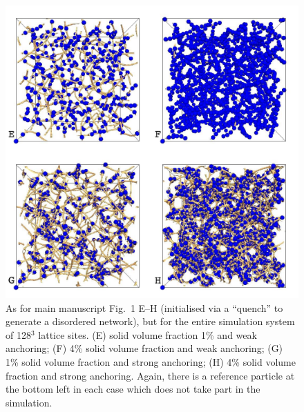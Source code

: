 \documentclass[12pt,twoside]{article}
\begin{document}
\begin{figure}[!h]
\begin{center}
\includegraphics[scale=0.35]{support-fig3.pdf}
\end{center}
\caption{As for main manuscript Fig.~1 E--H (initialised via a ``quench''
to generate a disordered network), but for the entire simulation
system of 128$^3$ lattice sites. (E) solid volume fraction 1\% and
weak anchoring; (F) 4\% solid volume fraction and weak anchoring;
(G) 1\% solid volume fraction and strong anchoring; (H) 4\% solid
volume fraction and strong anchoring. Again, there is a reference
particle at the bottom left in each case which does not take part
in the simulation.}
\end{figure}

\newpage
\end{document}

